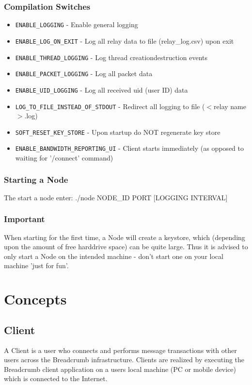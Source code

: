 \documentclass{article}
\begin{document}
\subsubsection{Compilation Switches}
\begin{itemize}
	\item \texttt{ENABLE\_LOGGING} - Enable general logging
	\item \texttt{ENABLE\_LOG\_ON\_EXIT} - Log all relay data to file (relay\_log.csv) upon exit 
	\item \texttt{ENABLE\_THREAD\_LOGGING} - Log thread creation\/destruction events
	\item \texttt{ENABLE\_PACKET\_LOGGING} - Log all packet data
	\item \texttt{ENABLE\_UID\_LOGGING} - Log all received uid (user ID) data
	\item \texttt{LOG\_TO\_FILE\_INSTEAD\_OF\_STDOUT} - Redirect all logging to file ($<$relay name$>$.log)
	\item \texttt{SOFT\_RESET\_KEY\_STORE} - Upon startup do NOT regenerate key store
	\item \texttt{ENABLE\_BANDWIDTH\_REPORTING\_UI} - Client starts immediately (as opposed to waiting for '/connect' command)
\end{itemize}
\subsubsection{Starting a Node}
The start a node enter: ./node NODE\_ID PORT [LOGGING INTERVAL]
\subsubsection{Important}
When starting for the first time, a Node will create a keystore, which (depending upon the amount of free harddrive space) can be quite large. Thus it 
is advised to only start a Node on the intended machine - don't start one on your local machine 'just for fun'.

\newpage

\section{Concepts}
\subsection{Client}
A Client is a user who connects and performs message transactions with other users across the Breadcrumb infrastructure.
Clients are realized by executing the Breadcrumb client application on a users local machine (PC or mobile device) which is connected to the Internet.
\end{document}

